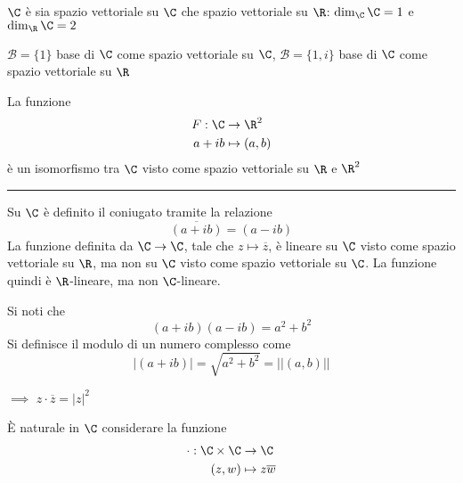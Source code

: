 $ \C $ è sia spazio vettoriale su $ \C $ che spazio vettoriale su $ \R $: $ \dim_{\C} \C = 1 $ e $ \dim_{\R} \C = 2 $

$ \mathscr{B}=\{1\} $ base di $ \C $ come spazio vettoriale su $ \C $, $ \mathscr{B}=\{1, i\} $ base di $ \C $ come spazio vettoriale su $ \R $

La funzione \begin{align*}
F:\C & \to \R^{2} \\
a+ib & \mapsto (a,b)
\end{align*} è un isomorfismo tra $ \C $ visto come spazio vettoriale su $ \R $ e $ \R^{2} $

\rule{7em}{.4pt}

Su $ \C $ è definito il coniugato tramite la relazione \[
    \overline{(a+ib)}=(a-ib)
\]
La funzione definita da $ \C\to \C $, tale che $ z\mapsto \overline{z} $, è lineare su $ \C  $ visto come spazio vettoriale su $ \R $, ma non su $ \C $ visto come spazio vettoriale su $ \C $. La funzione quindi è $ \R $-lineare, ma non $ \C $-lineare.

Si noti che \[
    (a+ib)(a-ib)=a^{2}+b^{2}
\]
Si definisce il modulo di un numero complesso come \[
    |(a+ib)|=\sqrt{a^{2}+b^{2}}=||(a,b)||
\] 

$\implies$ $ z \cdot \overline{z}=|z|^{2} $

È naturale in $ \C $ considerare la funzione \begin{align*}
\cdot : \C\times\C & \to \C \\
(z,w) & \mapsto z\overline{w}
\end{align*}



